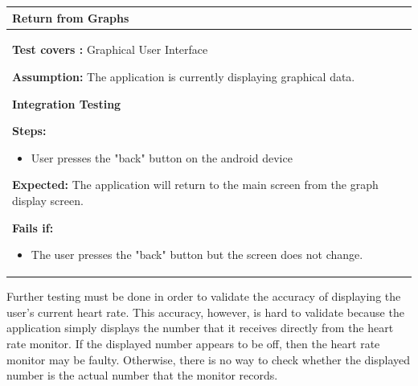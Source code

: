 \documentclass[letterpaper,english, 12pt]{scrreprt}
\begin{document}
\begin{center}
        \begin{tabular}{|C{15cm}|}
                \hline
                        \textbf{Return from Graphs}\\
                \hline
                        \begin{flushleft}
                                \textbf{Test covers : } Graphical User Interface
                        \end{flushleft}
                        \begin{flushleft}
                                \textbf{Assumption: } The application is currently displaying graphical data.
                        \end{flushleft}
			\begin{center}
				\textbf{Integration Testing}
			\end{center}
                        \begin{flushleft}
                                \textbf{Steps:}
                        \end{flushleft}
				\begin{itemize}
					\item User presses the "back" button on the android device
				\end{itemize}
			\begin{flushleft}
				\textbf{Expected: } The application will return to the main screen from the graph display screen.
			\end{flushleft}
                        \begin{flushleft}
                                \textbf{Fails if: }
                        \end{flushleft}
                                \begin{itemize}
                                        \item The user presses the "back" button but the screen does not change.
                                \end{itemize}
				\\
		\hline
        \end{tabular}
\end{center}

Further testing must be done in order to validate the accuracy of displaying the user's current heart rate. This accuracy, however, is hard to validate because the application simply displays the number that it receives directly from the heart rate monitor. If the displayed number appears to be off, then the heart rate monitor may be faulty. Otherwise, there is no way to check whether the displayed number is the actual number that the monitor records.
\end{document}
